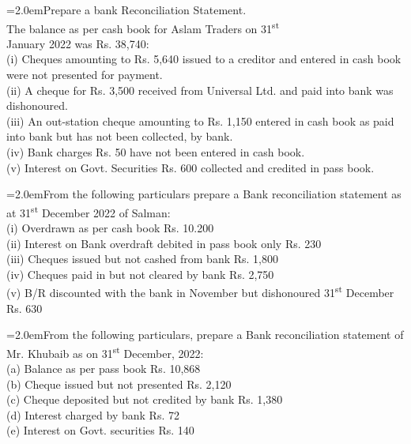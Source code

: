 \documentclass[11pt,a4paper]{article}
\newcommand{\lqn}[2]{\Needspace{6\baselineskip}\par\medskip\noindent\hangindent=2.0em\hangafter=1\makebox[2.0em][l]{\textbf{#1.}}#2\par}
\begin{document}
\lqn{69}{Prepare a bank Reconciliation Statement.\\
The balance as per cash book for Aslam Traders on 31\textsuperscript{st}\\
January 2022 was Rs. 38,740:\\
(i) Cheques amounting to Rs. 5,640 issued to a creditor and entered in cash book were not presented for payment.\\
(ii) A cheque for Rs. 3,500 received from Universal Ltd. and paid into bank was dishonoured.\\
(iii) An out-station cheque amounting to Rs. 1,150 entered in cash book as paid into bank but has not been collected, by bank.\\
(iv) Bank charges Rs. 50 have not been entered in cash book.\\
(v) Interest on Govt. Securities Rs. 600 collected and credited in pass book.\par
}
\lqn{70}{From the following particulars prepare a Bank reconciliation statement as at 31\textsuperscript{st}  December 2022 of Salman:\\
(i) Overdrawn as per cash book Rs. 10.200\\
(ii) Interest on Bank overdraft debited in pass book only Rs. 230\\
(iii) Cheques issued but not cashed from bank Rs. 1,800\\
(iv) Cheques paid in but not cleared by bank Rs. 2,750\\
(v) B/R discounted with the bank in November but dishonoured 31\textsuperscript{st} December Rs. 630\par
}
\lqn{71}{From the following particulars, prepare a Bank reconciliation statement of Mr. Khubaib as on 31\textsuperscript{st}  December, 2022:\\
(a) Balance as per pass book Rs. 10,868\\
(b) Cheque issued but not presented Rs. 2,120\\
(c) Cheque deposited but not credited by bank Rs. 1,380\\
(d) Interest charged by bank Rs. 72\\
(e) Interest on Govt. securities Rs. 140\par
}
\end{document}
